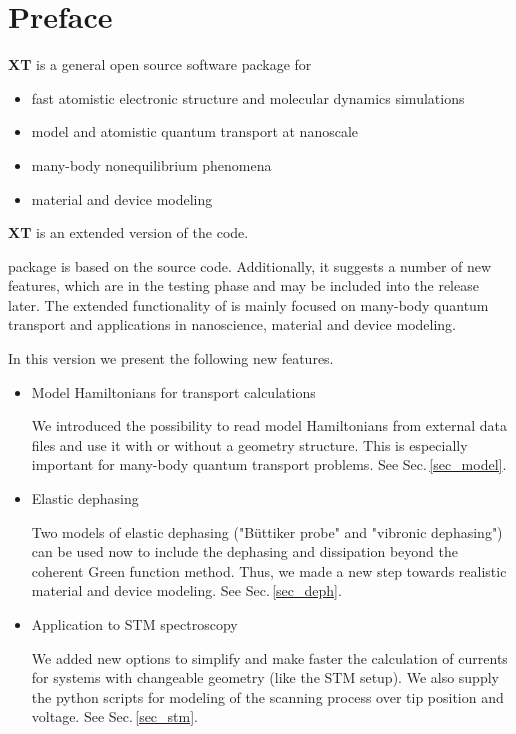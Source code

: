 {\new
\chapter*{Preface}

{\bf {\dftbp}XT} is a general open source software package for \\[-0.6cm]
\begin{itemize}
\item fast atomistic electronic structure and molecular dynamics simulations
\item model and atomistic quantum transport at nanoscale 
\item many-body nonequilibrium phenomena
\item material and device modeling
\end{itemize}  

{\bf {\dftbp}XT} is an extended version of the {\bf{\dftbp}} code.
 
{\dftbpxt} package \cite{OpenSuite} is based on the {\dftbp} \cite{dftbp-paper,Pecchia_NJP} source code. Additionally, it suggests a number of new features, which are in the testing phase and may be included into the \dftbp release later. The extended functionality of \dftbpxt is mainly focused on many-body quantum transport and applications in nanoscience, material and device modeling. 
 
\null
In this version we present the following new features.

\begin{itemize}

\item Model Hamiltonians for transport calculations

We introduced the possibility to read model Hamiltonians from external data files and use it with or without a geometry structure. This is especially important for many-body quantum transport problems. See Sec.\,\ref{sec_model}.
  
\item Elastic dephasing

Two models of elastic dephasing ("B\"uttiker probe" and "vibronic dephasing") can be used now to include the dephasing and dissipation    beyond the coherent Green function method. Thus, we made a new step towards realistic material and device modeling. See Sec.\,\ref{sec_deph}. 
  
\item Application to STM spectroscopy

We added new options to simplify and make faster the calculation of currents for systems with changeable geometry (like the STM setup). We also supply the python scripts for modeling of the scanning process over tip position and voltage. See Sec.\,\ref{sec_stm}.

\end{itemize}

}